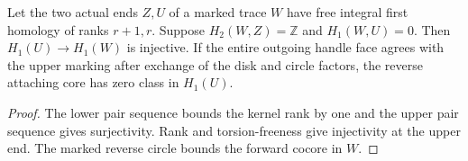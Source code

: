 \begin{proposition}
\label{prop:ed46-reverse-core}
\leanok
Let the two actual ends $Z,U$ of a marked trace $W$ have free integral
first homology of ranks $r+1,r$. Suppose $H_2(W,Z)=\mathbb Z$ and
$H_1(W,U)=0$. Then $H_1(U)\to H_1(W)$ is injective. If the entire
outgoing handle face agrees with the upper marking after exchange of
the disk and circle factors, the reverse attaching core has zero
class in $H_1(U)$.
\end{proposition}
\begin{proof}
\leanok
The lower pair sequence bounds the kernel rank by one and the upper
pair sequence gives surjectivity. Rank and torsion-freeness give
injectivity at the upper end. The marked reverse circle bounds the
forward cocore in $W$.
\end{proof}
